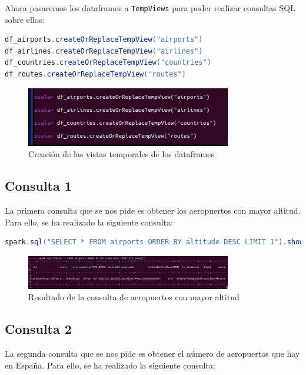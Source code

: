 Ahora pasaremos los dataframes a \texttt{TempViews} para poder realizar consultas SQL sobre ellos:

\begin{lstlisting}[language=scala]
df_airports.createOrReplaceTempView("airports")
df_airlines.createOrReplaceTempView("airlines")
df_countries.createOrReplaceTempView("countries")
df_routes.createOrReplaceTempView("routes")
\end{lstlisting}

\begin{figure}[H]
    \centering
    \includegraphics[width=0.8\textwidth]{figures/59.png}
    \caption{Creación de las vistas temporales de los dataframes}
    \label{fig:tempviews}
\end{figure}

\subsection{Consulta 1}

La primera consulta que se nos pide es obtener los aeropuertos con mayor altitud. Para ello, se ha realizado la siguiente consulta:

\begin{lstlisting}[language=scala]
spark.sql("SELECT * FROM airports ORDER BY altitude DESC LIMIT 1").show()
\end{lstlisting}

\begin{figure}[H]
    \centering
    \includegraphics[width=0.8\textwidth]{figures/60.png}
    \caption{Resultado de la consulta de aeropuertos con mayor altitud}
    \label{fig:consulta1}
\end{figure}

\subsection{Consulta 2}

La segunda consulta que se nos pide es obtener el número de aeropuertos que hay en España. Para ello, se ha realizado la siguiente consulta:

